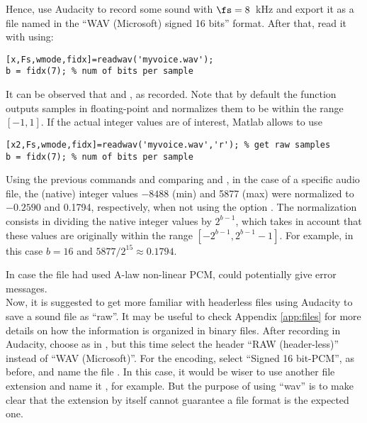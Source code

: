Hence, use Audacity to record some sound with $\fs=8$~kHz and export it as a file named  in the ``WAV (Microsoft) signed 16 bits'' format. After that, read it with {\matlab} using:
\begin{lstlisting}
[x,Fs,wmode,fidx]=readwav('myvoice.wav');
b = fidx(7); % num of bits per sample
\end{lstlisting}
It can be observed that  and , as recorded.
Note that by default the  function outputs samples in floating-point and normalizes them to be within the range $[-1,1]$. If the actual integer values are of interest, Matlab allows to use
\begin{lstlisting}
[x2,Fs,wmode,fidx]=readwav('myvoice.wav','r'); % get raw samples
b = fidx(7); % num of bits per sample
\end{lstlisting}
Using the previous commands and comparing  and , in the case of a specific audio file, the (native) integer values $-8488$ (min) and 5877 (max) were normalized to $-0.2590$ and 0.1794, respectively, when not using the option . The normalization consists in dividing the native integer values by $2^{b-1}$, which takes in account that these values are originally within the range $[-2^{b-1},2^{b-1}-1]$. For example, in this case $b=16$ and $5877/2^{15} \approx 0.1794$.

In case the file had used A-law non-linear PCM, {\matlab} could potentially give error messages.\\

Now, it is suggested to get more familiar with headerless files using Audacity to save a sound file as ``raw''.
It may be useful to check Appendix \ref{app:files} for more details on how the information is organized in binary files.
After recording in Audacity, choose  as in , but this time select the header ``RAW (header-less)'' instead of ``WAV (Microsoft)''. For the encoding, select ``Signed 16 bit-PCM'', as before, and name the file . In this case, it would be wiser to use another file extension and name it , for example. But the purpose of using ``wav'' is to make clear that the extension by itself cannot guarantee a file format is the expected one. 

